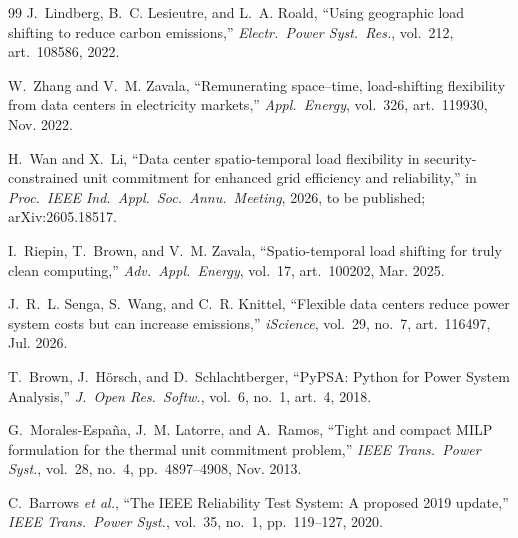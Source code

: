 \documentclass[conference]{IEEEtran}
\begin{document}
\begin{thebibliography}{99}
 J.~Lindberg, B.~C. Lesieutre, and L.~A. Roald, ``Using geographic load shifting to reduce carbon emissions,'' \emph{Electr.\ Power Syst.\ Res.}, vol.~212, art.~108586, 2022.

 W.~Zhang and V.~M. Zavala, ``Remunerating space--time, load-shifting flexibility from data centers in electricity markets,'' \emph{Appl.\ Energy}, vol.~326, art.~119930, Nov. 2022.

 H.~Wan and X.~Li, ``Data center spatio-temporal load flexibility in security-constrained unit commitment for enhanced grid efficiency and reliability,'' in \emph{Proc.\ IEEE Ind.\ Appl.\ Soc.\ Annu.\ Meeting}, 2026, to be published; arXiv:2605.18517.

 I.~Riepin, T.~Brown, and V.~M. Zavala, ``Spatio-temporal load shifting for truly clean computing,'' \emph{Adv.\ Appl.\ Energy}, vol.~17, art.~100202, Mar. 2025.

 J.~R.~L. Senga, S.~Wang, and C.~R. Knittel, ``Flexible data centers reduce power system costs but can increase emissions,'' \emph{iScience}, vol.~29, no.~7, art.~116497, Jul. 2026.

 T.~Brown, J.~H\"orsch, and D.~Schlachtberger, ``PyPSA: Python for Power System Analysis,'' \emph{J.\ Open Res.\ Softw.}, vol.~6, no.~1, art.~4, 2018.

 G.~Morales-Espa\~na, J.~M. Latorre, and A.~Ramos, ``Tight and compact MILP formulation for the thermal unit commitment problem,'' \emph{IEEE Trans.\ Power Syst.}, vol.~28, no.~4, pp.~4897--4908, Nov. 2013.

 C.~Barrows \emph{et al.}, ``The IEEE Reliability Test System: A proposed 2019 update,'' \emph{IEEE Trans.\ Power Syst.}, vol.~35, no.~1, pp.~119--127, 2020.

\end{thebibliography}
\end{document}
